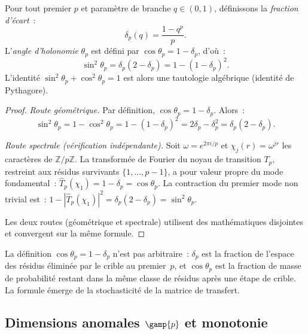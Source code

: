 \documentclass[12pt,a4paper]{article}
\begin{document}
\begin{theorembox}
Pour tout premier $p$ et param\`etre de branche $q \in (0,1)$,
d\'efinissons la \emph{fraction d'\'ecart}~:
\begin{equation}
  \delta_p(q) = \frac{1 - q^p}{p}.
  \tag{A.6}
\end{equation}
L'\emph{angle d'holonomie} $\theta_p$ est d\'efini par
$\cos\theta_p = 1 - \delta_p$, d'o\`u~:
\begin{equation}
  \sin^2\!\theta_p = \delta_p(2 - \delta_p) = 1 - (1-\delta_p)^2.
  \tag{A.7}
\end{equation}
L'identit\'e $\sin^2\!\theta_p + \cos^2\!\theta_p = 1$ est alors une
tautologie alg\'ebrique (identit\'e de Pythagore).

\begin{proof}
\emph{Route g\'eom\'etrique.}
Par d\'efinition, $\cos\theta_p = 1 - \delta_p$. Alors~:
\[
  \sin^2\!\theta_p = 1 - \cos^2\!\theta_p
  = 1 - (1-\delta_p)^2 = 2\delta_p - \delta_p^2 = \delta_p(2-\delta_p).
\]

\emph{Route spectrale (v\'erification ind\'ependante).}
Soit $\omega = e^{2\pi i/p}$ et $\chi_j(r) = \omega^{jr}$ les
caract\`eres de $\mathbb{Z}/p\mathbb{Z}$. La transform\'ee de Fourier
du noyau de transition $T_p$, restreint aux r\'esidus survivants
$\{1, \ldots, p-1\}$, a pour valeur propre du mode fondamental~:
$\widehat{T}_p(\chi_1) = 1 - \delta_p = \cos\theta_p$. La contraction
du premier mode non trivial est~:
$1 - |\widehat{T}_p(\chi_1)|^2 = \delta_p(2-\delta_p) = \sin^2\!\theta_p$.

Les deux routes (g\'eom\'etrique et spectrale) utilisent des
math\'ematiques disjointes et convergent sur la m\^eme formule.
\end{proof}
\end{theorembox}

\begin{remark}
La d\'efinition $\cos\theta_p = 1 - \delta_p$ n'est pas arbitraire~:
$\delta_p$ est la fraction de l'espace des r\'esidus \'elimin\'ee par le
crible au premier~$p$, et $\cos\theta_p$ est la fraction de masse de
probabilit\'e restant dans la m\^eme classe de r\'esidus apr\`es une
\'etape de crible. La formule \'emerge de la stochasticit\'e de la
matrice de transfert.
\end{remark}

\subsection{Dimensions anomales $\gamp{p}$ et monotonie}
\label{app:gamma}
\end{document}
